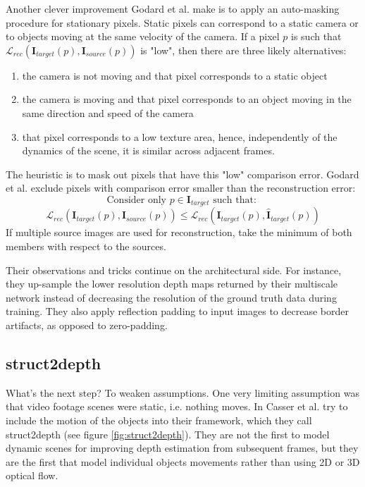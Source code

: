 Another clever improvement Godard et al. make is to apply an auto-masking procedure for stationary pixels.
Static pixels can correspond to a static camera or to objects moving at the same velocity of the camera.
If a pixel $p$ is such that $\mathcal{L}_{rec}(\mathbf{I}_{target}(p), \mathbf{I}_{source}(p))$ is "low", then there are three likely alternatives:
\begin{enumerate}
\item the camera is not moving and that pixel corresponds to a static object
\item the camera is moving and that pixel corresponds to an object moving in the same direction and speed of the camera
\item that pixel corresponds to a low texture area, hence, independently of the dynamics of the scene, it is similar across adjacent frames.
\end{enumerate}
The heuristic is to mask out pixels that have this "low" comparison error.
Godard et al. exclude pixels with comparison error smaller than the reconstruction error:
\[
	\text{Consider only } p \in \mathbf{I}_{target} \text{ such that: }
\]\[
	\mathcal{L}_{rec}(\mathbf{I}_{target}(p), \mathbf{I}_{source}(p))
		\leq
	\mathcal{L}_{rec}(\mathbf{I}_{target}(p), \hat{\mathbf{I}}_{target}(p))
\]
If multiple source images are used for reconstruction, take the minimum of both members with respect to the sources.

Their observations and tricks continue on the architectural side.
For instance, they up-sample the lower resolution depth maps returned by their multiscale network instead of decreasing the resolution of the ground truth data during training.
They also apply reflection padding to input images to decrease border artifacts, as opposed to zero-padding.

\subsection{struct2depth}
What's the next step? To weaken assumptions.
One very limiting assumption was that video footage scenes were static, i.e. nothing moves.
In \cite{struct2depth} Casser et al. try to include the motion of the objects into their framework, which they call struct2depth (see figure \ref{fig:struct2depth}).
They are not the first to model dynamic scenes for improving depth estimation from subsequent frames, but they are the first that model individual objects movements rather than using 2D or 3D optical flow.

